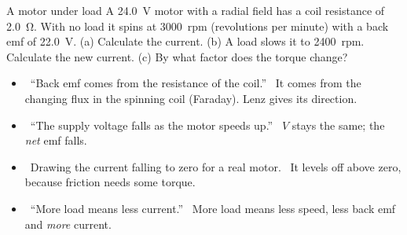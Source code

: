 \begin{workedexample}{A motor under load}\label{ch5:we:load}
A \qty{24.0}{V} motor with a radial field has a coil resistance of \qty{2.0}{\ohm}.
With no load it spins at \qty{3000}{rpm} (revolutions per minute) with a back emf of
\qty{22.0}{V}.
(a) Calculate the current. (b) A load slows it to \qty{2400}{rpm}. Calculate the new
current. (c) By what factor does the torque change?
\end{workedexample}

\begin{mistakes}
\begin{itemize}
  \item \xmark\ ``Back emf comes from the resistance of the coil.'' \cmark\ It comes
        from the changing flux in the spinning coil (Faraday). Lenz gives its direction.
  \item \xmark\ ``The supply voltage falls as the motor speeds up.'' \cmark\ $V$ stays
        the same; the \emph{net} emf falls.
  \item \xmark\ Drawing the current falling to zero for a real motor.
        \cmark\ It levels off above zero, because friction needs some torque.
  \item \xmark\ ``More load means less current.'' \cmark\ More load means less speed,
        less back emf and \emph{more} current.
\end{itemize}
\end{mistakes}

